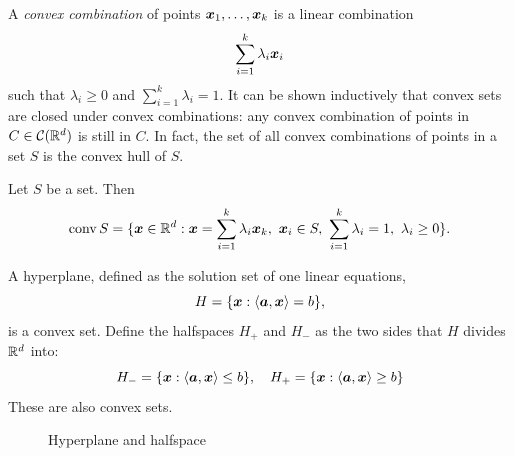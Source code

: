 A {\em convex combination} of points $\bm{x}_1,\dots,\bm{x}_k$ is a linear combination
\begin{equation*}
 \sum_{i=1}^k \lambda_i \bm{x}_i
\end{equation*}
such that $\lambda_i\geq 0$ and $\sum_{i=1}^k \lambda_i = 1$. It can be shown inductively that convex sets are closed under convex combinations: any convex combination of points in $C\in \mathcal{C}(\mathbb{R}^d)$ is still in $C$. In fact, the set of all convex combinations of points in a set $S$ is the convex hull of $S$.

\begin{lemma}
 Let $S$ be a set. Then 
 \begin{equation*}
  \conv{S} = \{\vct{x}\in \R^d \mid \vct{x}=\sum_{i=1}^k \lambda_i \vct{x}_k, \ \vct{x}_i\in S, \ \sum_{i=1}^k \lambda_i = 1, \ \lambda_i\geq 0\}.
 \end{equation*}
\end{lemma}

\begin{example}
A hyperplane, defined as the solution set of one linear equations,
\begin{equation*}
 H = \{\bm{x} \mathrel{\mathop{:}} \langle {\bm{a}}, {\bm{x}} \rangle = b\},
\end{equation*}
is a convex set.
Define the halfspaces $H_+$ and $H_-$ as the two sides that $H$ divides $\mathbb{R}^d$ into:
\begin{equation*}
 H_- = \{\bm{x}\mathrel{\mathop{:}} \langle {\bm{a}}, {\bm{x}} \rangle\leq b\}, \quad H_+ = \{\bm{x}\mathrel{\mathop{:}} \langle {\bm{a}}, {\bm{x}} \rangle\geq b\}
\end{equation*}
These are also convex sets. 
\begin{figure}[h!]
\centering
{}
\caption{Hyperplane and halfspace}
\end{figure}
\end{example}

